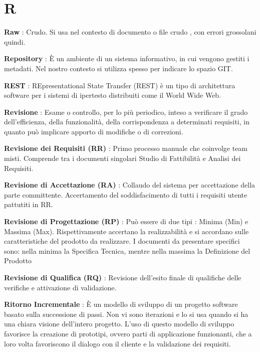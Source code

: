 \documentclass[12pt,a4paper,titlepage]{article}
\begin{document}
\section{R}
\begin{trivlist}
\item \textbf{Raw} : Crudo. Si usa nel contesto di documento o file crudo , con errori grossolani quindi.
\item \textbf{Repository} : È un ambiente di un sistema informativo, in cui vengono gestiti i metadati. Nel nostro contesto si utilizza spesso per indicare lo spazio GIT.
\item \textbf{REST} : REpresentational State Transfer (REST) è un tipo di architettura software per i sistemi di ipertesto distribuiti come il World Wide Web.
\item \textbf{Revisione} : Esame o controllo, per lo più periodico, inteso a verificare il grado dell'efficienza, della funzionalità, della corrispondenza a determinati requisiti, in quanto può implicare apporto di modifiche o di correzioni.
\item \textbf{Revisione dei Requisiti (RR)} : Primo processo manuale che coinvolge team misti. Comprende tra i documenti singolari Studio di Fattibilità e Analisi dei Requisiti.
\item \textbf{Revisione di Accettazione (RA)} : Collaudo del sistema per accettazione della parte committente. Accertamento del soddisfacimento di tutti i requisiti utente pattutiti in RR.
\item \textbf{Revisione di Progettazione (RP)} : Può essere di due tipi : Minima (Min) e Massima (Max). Rispettivamente accertano la realizzabilità e si accordano sulle caratteristiche del prodotto da realizzare. I documenti da presentare specifici sono: nella minima la Specifica Tecnica, mentre nella massima la Definizione del Prodotto
\item \textbf{Revisione di Qualifica (RQ)} : Revisione dell'esito finale di qualifiche delle verifiche e attivazione di validazione.
\item \textbf{Ritorno Incrementale} : È un modello di sviluppo di un progetto software basato sulla successione di passi. Non vi sono iterazioni e lo si usa quando si ha una chiara visione dell'intero progetto. L'uso di questo modello di sviluppo favorisce la creazione di prototipi, ovvero parti di applicazione funzionanti, che a loro volta favoriscono il dialogo con il cliente e la validazione dei requisiti.  
\end{trivlist}
\end{document}
